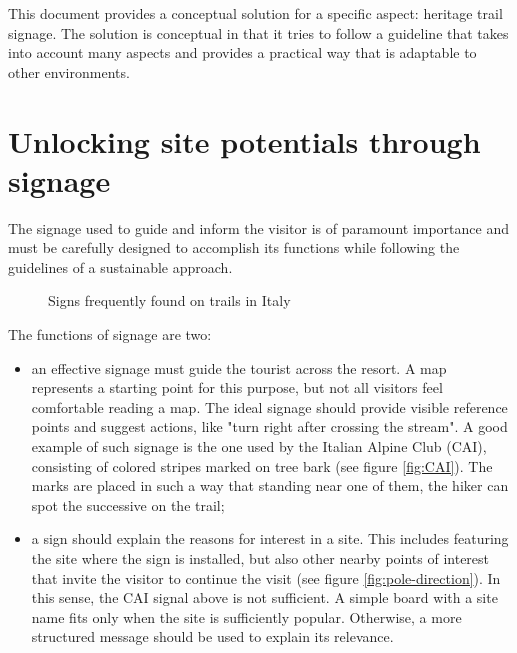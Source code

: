 \documentclass[sustainability,article,submit,pdftex,moreauthors]{Definitions/mdpi}
\begin{document}
This document provides a conceptual solution for a specific aspect: heritage trail signage. The solution is conceptual in that it tries to follow a guideline that takes into account many aspects and provides a practical way that is adaptable to other environments.

\section{Unlocking site potentials through signage \label{sec:signage}}

The signage used to guide and inform the visitor is of paramount importance and must be carefully designed to accomplish its functions while following the guidelines of a sustainable approach.

\begin{figure}
\hfill
{}
\caption{Signs frequently found on trails in Italy}
\label{fig:traditional}
\end{figure}

The functions of signage are two:
\begin {itemize}
\item an effective signage must guide the tourist across the resort. A map represents a starting point for this purpose, but not all visitors feel comfortable reading a map. The ideal signage should provide visible reference points and suggest actions, like "turn right after crossing the stream". A good example of such signage is the one used by the Italian Alpine Club (CAI), consisting of colored stripes marked on tree bark (see figure \ref{fig:CAI}). The marks are placed in such a way that standing near one of them, the hiker can spot the successive on the trail;
\item a sign should explain the reasons for interest in a site. This includes featuring the site where the sign is installed, but also other nearby points of interest that invite the visitor to continue the visit (see figure \ref{fig:pole-direction}). In this sense, the CAI signal above is not sufficient. A simple board with a site name fits only when the site is sufficiently popular. Otherwise, a more structured message should be used to explain its relevance.
\end{itemize}
\end{document}
